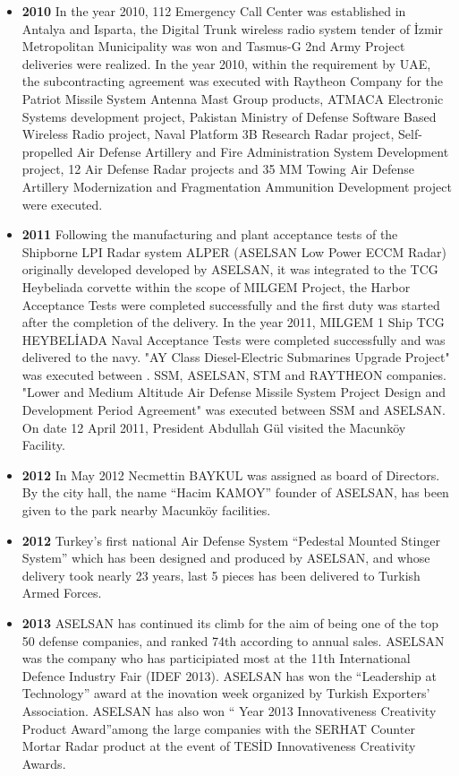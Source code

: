 \begin{itemize}
\item \textbf{ 2010 }
\subitem In the year 2010, 112 Emergency Call Center was established in Antalya and Isparta, the Digital Trunk wireless radio system tender of İzmir Metropolitan Municipality was won and Tasmus-G 2nd Army Project deliveries were realized.
\subitem In the year 2010, within the requirement by UAE, the subcontracting agreement was executed with Raytheon Company for the Patriot Missile System Antenna Mast Group products, ATMACA Electronic Systems development project, Pakistan Ministry of Defense Software Based Wireless Radio project, Naval Platform 3B Research Radar project, Self-propelled Air Defense Artillery and Fire Administration System Development project, 12 Air Defense Radar projects and 35 MM Towing Air Defense Artillery Modernization and Fragmentation Ammunition Development project were executed.
\item \textbf{ 2011 }
\subitem Following the manufacturing and plant acceptance tests of the Shipborne LPI Radar system ALPER (ASELSAN Low Power ECCM Radar) originally developed developed by ASELSAN, it was integrated to the TCG Heybeliada corvette within the scope of MILGEM Project, the Harbor Acceptance Tests were completed successfully and the first duty was started after the completion of the delivery.
\subitem In the year 2011, MILGEM 1 Ship TCG HEYBELİADA Naval Acceptance Tests were completed successfully and was delivered to the navy. "AY Class Diesel-Electric Submarines Upgrade Project" was executed between . SSM, ASELSAN, STM and RAYTHEON companies. "Lower and Medium Altitude Air Defense Missile System Project Design and Development Period Agreement" was executed between SSM and ASELSAN. On date 12 April 2011, President Abdullah Gül visited the Macunköy Facility.
\item \textbf{ 2012 }
\subitem In May 2012 Necmettin BAYKUL was assigned as board of Directors. By the city hall, the name “Hacim KAMOY” founder of ASELSAN, has been given to the park nearby Macunköy facilities.
\item \textbf{  2012 }
\subitem Turkey’s first national Air Defense System “Pedestal Mounted Stinger System” which has been designed and produced by ASELSAN, and whose delivery took nearly 23 years, last 5 pieces has been delivered to Turkish Armed Forces.
\item \textbf{ 2013 }
\subitem ASELSAN has continued its climb for the aim of being one of the top 50 defense companies, and ranked 74th according to annual sales.
\subitem ASELSAN was the company who has participiated most at the 11th International Defence Industry Fair (IDEF 2013).	
\subitem ASELSAN has won the “Leadership at Technology” award at the inovation week organized by Turkish Exporters’ Association. ASELSAN has also won “ Year 2013 Innovativeness Creativity Product Award”among the large companies with the SERHAT Counter Mortar Radar product at the event of TESİD Innovativeness Creativity Awards.​
\subitem 





\end{itemize}

